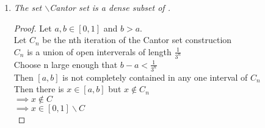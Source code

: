 \documentclass[12pt, a4paper]{article}
\begin{document}
\begin{enumerate}
\begin{proof}
                    Idea is to turn a 2 from the ``tail" of $x$ into a 0\\
                    Let $d_n^\epsilon$ be the first non zero digit of $\epsilon$\\
                    Let $d_m^x$ be the last 0 of the ternary expansion of $x$.\\
                    $k=max(m, n)$\\
                    $a = 2*3^{k+1}$\\
                    Then $x-a > x-\epsilon$ and it is an element of $C$
                    
                    Every neighborhood of $x$ contains an element in $C$. Therefore $x$ is an accumulation point. 
                    
                \end{proof}
                \item \textit{The set {\normalfont[0, 1]}$\backslash$Cantor set is a dense subset of {\normalfont[0, 1]}.}
                
                    \begin{proof}
                        Let $a,b\in[0,1]$ and $b > a$.\\
                        Let $C_n$ be the nth iteration of the Cantor set construction\\
                        $C_n$ is a union of open interverals of length $\frac{1}{3^n}$\\
                        Choose n large enough that $b-a < \frac{1}{3^n}$\\
                        Then $[a,b]$ is not completely contained in any one interval of $C_n$\\
                        Then there is $x\in[a,b]$ but $x \not\in C_n$\\
                        $\implies x\not\in C$\\
                        $\implies x\in[0,1]\backslash C$\\
                    \end{proof}
        \end{enumerate}
\end{document}
